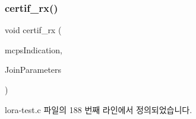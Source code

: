 \subsubsection{\texorpdfstring{certif\+\_\+rx()}{certif\_rx()}}
{\footnotesize\ttfamily void certif\+\_\+rx (\begin{DoxyParamCaption}\item[{\mbox{\hyperlink{group___l_o_r_a_m_a_c_ga202591b6553d63fae89bd42787496616}{Mcps\+Indication\+\_\+t}} $\ast$}]{mcps\+Indication,  }\item[{\mbox{\hyperlink{group___l_o_r_a_m_a_c_gab12f7f7d9bdfb8067d56f7c9f1297d95}{Mlme\+Req\+Join\+\_\+t}} $\ast$}]{Join\+Parameters }\end{DoxyParamCaption})}



lora-\/test.\+c 파일의 188 번째 라인에서 정의되었습니다.


